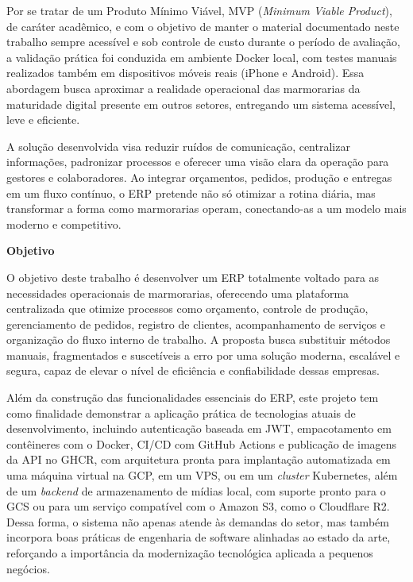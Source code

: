 Por se tratar de um Produto Mínimo Viável, MVP (\textit{Minimum Viable Product}), de caráter acadêmico, e com o objetivo de manter o material documentado neste trabalho sempre acessível e sob controle de custo durante o período de avaliação, a validação prática foi conduzida em ambiente Docker local, com testes manuais realizados também em dispositivos móveis reais (iPhone e Android). Essa abordagem busca aproximar a realidade operacional das marmorarias da maturidade digital presente em outros setores, entregando um sistema acessível, leve e eficiente.

A solução desenvolvida visa reduzir ruídos de comunicação, centralizar informações, padronizar processos e oferecer uma visão clara da operação para gestores e colaboradores. Ao integrar orçamentos, pedidos, produção e entregas em um fluxo contínuo, o ERP pretende não só otimizar a rotina diária, mas transformar a forma como marmorarias operam, conectando-as a um modelo mais moderno e competitivo.
    
\vspace{0.5cm}
\textbf{Objetivo}
\vspace{0.5cm}

O objetivo deste trabalho é desenvolver um ERP totalmente voltado para as necessidades operacionais de marmorarias, oferecendo uma plataforma centralizada que otimize processos como orçamento, controle de produção, gerenciamento de pedidos, registro de clientes, acompanhamento de serviços e organização do fluxo interno de trabalho. A proposta busca substituir métodos manuais, fragmentados e suscetíveis a erro por uma solução moderna, escalável e segura, capaz de elevar o nível de eficiência e confiabilidade dessas empresas.

Além da construção das funcionalidades essenciais do ERP, este projeto tem como finalidade demonstrar a aplicação prática de tecnologias atuais de desenvolvimento, incluindo autenticação baseada em JWT, empacotamento em contêineres com o Docker, CI/CD com GitHub Actions e publicação de imagens da API no GHCR, com arquitetura pronta para implantação automatizada em uma máquina virtual na GCP, em um VPS, ou em um \textit{cluster} Kubernetes, além de um \textit{backend} de armazenamento de mídias local, com suporte pronto para o GCS ou para um serviço compatível com o Amazon S3, como o Cloudflare R2. Dessa forma, o sistema não apenas atende às demandas do setor, mas também incorpora boas práticas de engenharia de software alinhadas ao estado da arte, reforçando a importância da modernização tecnológica aplicada a pequenos negócios.

